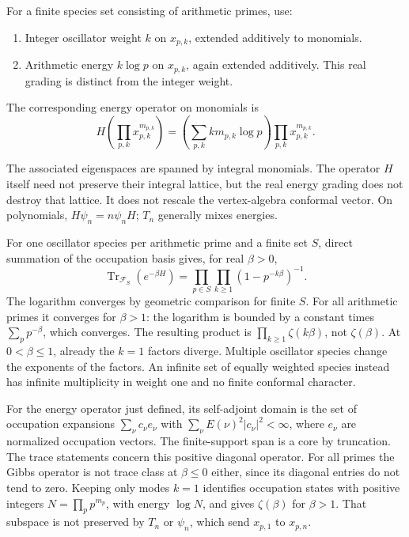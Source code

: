 \begin{convention}
\label{v4-arith:gb:two-gradings}
\label{v4-arith:conv:two-grading}
For a finite species set consisting of arithmetic primes, use:
\begin{enumerate}
\item[(i)] Integer oscillator weight \(k\) on \(x_{p,k}\), extended
additively to monomials.
\item[(ii)] Arithmetic energy \(k\log p\) on \(x_{p,k}\), again extended
additively. This real grading is distinct from the integer weight.
\end{enumerate}
\end{convention}
The corresponding energy operator on monomials is
\[
 H\left(\prod_{p,k}x_{p,k}^{m_{p,k}}\right)
 =\left(\sum_{p,k}k m_{p,k}\log p\right)
   \prod_{p,k}x_{p,k}^{m_{p,k}}.
\]
\begin{observation}
\label{v4-arith:obs:logp-destroys-integrality}
The associated eigenspaces are spanned by integral monomials. The operator
\(H\) itself need not preserve their integral lattice, but the real
energy grading does not destroy that lattice. It does not rescale the
vertex-algebra conformal vector. On polynomials,
\(H\psi_n=n\psi_nH\); \(T_n\) generally mixes energies.
\end{observation}
 For one
oscillator species per arithmetic prime and a finite set \(S\), direct
summation of the occupation basis gives, for real \(\beta>0\),
\[
 \operatorname{Tr}_{\mathcal F_S}(e^{-\beta H})
 =\prod_{p\in S}\prod_{k\ge1}(1-p^{-k\beta})^{-1}.
\]
The logarithm converges by geometric comparison for finite \(S\).
For all arithmetic primes it converges for \(\beta>1\): the logarithm
is bounded by a constant times \(\sum_p p^{-\beta}\), which converges.
The resulting product is \(\prod_{k\ge1}\zeta(k\beta)\), not
\(\zeta(\beta)\). At \(0<\beta\le1\), already the \(k=1\) factors
diverge. Multiple oscillator species change the exponents of the
factors. An infinite set of equally weighted species instead has
infinite multiplicity in weight one and no finite conformal character.

For the energy operator just defined, its self-adjoint domain is the
set of occupation expansions \(\sum_\nu c_\nu e_\nu\) with
\(\sum_\nu E(\nu)^2|c_\nu|^2<\infty\), where \(e_\nu\) are normalized
occupation vectors. The finite-support span is a core by truncation.
The trace statements concern this positive diagonal operator.
For all primes the Gibbs operator is not trace class at
\(\beta\le0\) either, since its diagonal entries do not tend to zero.
Keeping only modes \(k=1\) identifies occupation states with positive
integers \(N=\prod_pp^{m_p}\), with energy \(\log N\), and gives
\(\zeta(\beta)\) for \(\beta>1\). That subspace is not preserved by
\(T_n\) or \(\psi_n\), which send \(x_{p,1}\) to \(x_{p,n}\).

